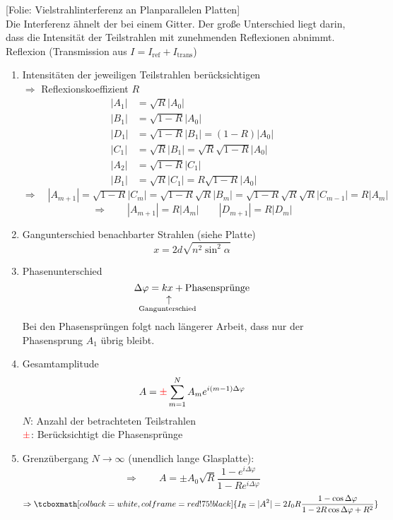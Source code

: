 \documentclass[titlepage,11pt,a4paper,ngerman]{report}
\newcommand{\tx}[1]{\textrm{#1}}
\newcommand{\custo}[3]{\underset{\scriptstyle\overset{\mkern4mu\rotatebox{-90}{$\,#1$}}{#3}}{#2}}
\newcommand{\folie}[1]{\color{gray}[Folie: #1]\color{black}}
\newcommand{\lcom}[1]{\color{MidnightBlue}#1\color{black}}
\newcommand{\rmbox}[1]{\tcboxmath[colback=white,colframe=red!75!black]{#1}}
\begin{document}
\folie{Vielstrahlinterferenz an Planparallelen Platten}\\
\lcom{Die Interferenz ähnelt der bei einem Gitter. Der große Unterschied liegt darin, dass die Intensität der Teilstrahlen mit zunehmenden Reflexionen abnimmt. }\\
Reflexion (Transmission aus $ I = I_{\tx{ref}} + I_{\tx{trans}} $)
\begin{enumerate}[(1)]
	\item Intensitäten der jeweiligen Teilstrahlen berücksichtigen\\
	$ \Rightarrow $ Reflexionskoeffizient $ R $
	\begin{align*}
	|A_1| &= \sqrt{R} |A_0|\\
	|B_1| &= \sqrt{1 - R} |A_0|\\
	|D_1| &= \sqrt{1-R} |B_1| = (1-R) |A_0|\\
	|C_1| &= \sqrt{R} |B_1| = \sqrt{R}\sqrt{1 - R} |A_0|\\
	|A_2| &= \sqrt{1 - R} |C_1|\\
	|B_1| &= \sqrt{R} |C_1| = R \sqrt{1 - R} |A_0|
	\end{align*}
	\vspace{10pt}
	$\Rightarrow \quad |A_{m+1}| = \sqrt{1-R} |C_m| = \sqrt{1-R} \sqrt{R} |B_m| = \sqrt{1-R} \sqrt{R} \sqrt{R} |C_{m-1}| = R |A_m|$
	\vspace{5pt}
	\begin{equation*}
	\Rightarrow \qquad |A_{m+1}| = R |A_m| \qquad |D_{m+1}| = R |D_m|
	\end{equation*}
	\item Gangunterschied benachbarter Strahlen (siehe Platte)
	\begin{equation*}
	x = 2d \sqrt{n^2 \sin^2 \alpha} 
	\end{equation*}
	\item Phasenunterschied
	\begin{equation*}
	\Delta \varphi = \custo{\leftarrow}{kx}{\mathclap{\tx{Gangunterschied}}} + \tx{Phasensprünge}
	\end{equation*}
	Bei den Phasensprüngen folgt nach längerer Arbeit, dass nur der Phasensprung $ A_1 $ übrig bleibt.
	\item Gesamtamplitude
	\begin{equation*}
	A = \color{red} \pm \color{black} \sum_{m=1}^{N} A_m e^{i(m-1) \Delta \varphi}
	\end{equation*}
	$ N $: Anzahl der betrachteten Teilstrahlen\\
	$ \color{red} \pm \color{black} $: Berücksichtigt die Phasensprünge
	\item Grenzübergang $ N \to \infty $ (unendlich lange Glasplatte):
	\begin{equation*}
	\Rightarrow \qquad A = \pm A_0 \sqrt{R} \frac{1 - e^{i \Delta \varphi}}{1 - R e^{i \Delta \varphi}}
	\end{equation*}
	\begin{equation*}
	\Rightarrow \rmbox{I_R = |A^2| = 2 I_0 R \frac{1 - \cos \Delta \varphi}{1 - 2 R \cos \Delta \varphi + R^2}}
	\end{equation*}
\end{enumerate}
\end{document}
